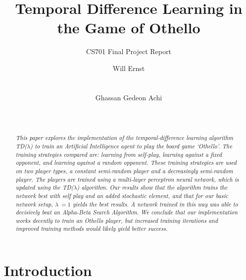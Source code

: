 \documentclass{sig-alternate-05-2015}
\begin{document}
\title{Temporal Difference Learning in the Game of Othello} 

\subtitle{CS701 Final Project Report}


\author{
%
\alignauthor
Will Ernst\\
       \\
       \\
\alignauthor
Ghassan Gedeon Achi\\
       \\
       \\
}

\maketitle

\begin{abstract}

	\textit{This paper explores the implementation of the temporal-difference learning algorithm TD(\(\lambda\)) to train an Artificial Intelligence agent to play the board game `Othello'. The training strategies compared are: learning from self-play, learning against a fixed opponent, and learning against a random opponent. These training strategies are used on two player types, a constant semi-random player and a decreasingly semi-random player. The players are trained using a multi-layer perceptron neural network, which is updated using the TD(\(\lambda\)) algorithm. Our results show that the algorithm trains the network best with self play and an added stochastic element, and that for our basic network setup, $\lambda\ = 1$ yields the best results. A network trained in this way was able to decisively beat an Alpha-Beta Search Algorithm. We conclude that our implementation works decently to train an Othello player, but increased training iterations and improved training methods would likely yield better success.}

\end{abstract}



\section{Introduction}
\end{document}
